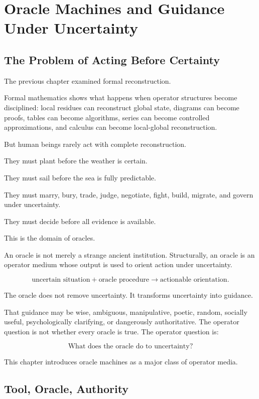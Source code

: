 \documentclass[11pt]{book}
\begin{document}
\chapter{Oracle Machines and Guidance Under Uncertainty}

\section{The Problem of Acting Before Certainty}

The previous chapter examined formal reconstruction.

Formal mathematics shows what happens when operator structures become disciplined: local residues can reconstruct global state, diagrams can become proofs, tables can become algorithms, series can become controlled approximations, and calculus can become local-global reconstruction.

But human beings rarely act with complete reconstruction.

They must plant before the weather is certain.

They must sail before the sea is fully predictable.

They must marry, bury, trade, judge, negotiate, fight, build, migrate, and govern under uncertainty.

They must decide before all evidence is available.

This is the domain of oracles.

An oracle is not merely a strange ancient institution. Structurally, an oracle is an operator medium whose output is used to orient action under uncertainty.

\[
\text{uncertain situation}
+
\text{oracle procedure}
\rightarrow
\text{actionable orientation}.
\]

The oracle does not remove uncertainty. It transforms uncertainty into guidance.

That guidance may be wise, ambiguous, manipulative, poetic, random, socially useful, psychologically clarifying, or dangerously authoritative. The operator question is not whether every oracle is true. The operator question is:

\[
\text{What does the oracle do to uncertainty?}
\]

This chapter introduces oracle machines as a major class of operator media.

\section{Tool, Oracle, Authority}
\end{document}

